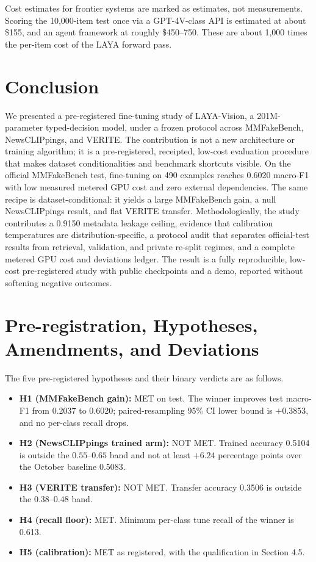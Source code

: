 \documentclass{article} %
\begin{document}
Cost estimates for frontier systems are marked as estimates, not measurements. Scoring the 10,000-item test once via a GPT-4V-class API is estimated at about \$155, and an agent framework at roughly \$450--750. These are about 1,000 times the per-item cost of the LAYA forward pass.

\section{Conclusion}
\label{sec:conclusion}
We presented a pre-registered fine-tuning study of LAYA-Vision, a 201M-parameter typed-decision model, under a frozen protocol across MMFakeBench, NewsCLIPpings, and VERITE. The contribution is not a new architecture or training algorithm; it is a pre-registered, receipted, low-cost evaluation procedure that makes dataset conditionalities and benchmark shortcuts visible. On the official MMFakeBench test, fine-tuning on 490 examples reaches 0.6020 macro-F1 with low measured metered GPU cost and zero external dependencies. The same recipe is dataset-conditional: it yields a large MMFakeBench gain, a null NewsCLIPpings result, and flat VERITE transfer. Methodologically, the study contributes a 0.9150 metadata leakage ceiling, evidence that calibration temperatures are distribution-specific, a protocol audit that separates official-test results from retrieval, validation, and private re-split regimes, and a complete metered GPU cost and deviations ledger. The result is a fully reproducible, low-cost pre-registered study with public checkpoints and a demo, reported without softening negative outcomes.




\appendix
\section{Pre-registration, Hypotheses, Amendments, and Deviations}
\label{app:protocol}
The five pre-registered hypotheses and their binary verdicts are as follows.
\begin{itemize}
    \item \textbf{H1 (MMFakeBench gain):} MET on test. The winner improves test macro-F1 from 0.2037 to 0.6020; paired-resampling 95\% CI lower bound is \(+0.3853\), and no per-class recall drops.
    \item \textbf{H2 (NewsCLIPpings trained arm):} NOT MET. Trained accuracy 0.5104 is outside the \(0.55\)--\(0.65\) band and not at least \(+6.24\) percentage points over the October baseline 0.5083.
    \item \textbf{H3 (VERITE transfer):} NOT MET. Transfer accuracy 0.3506 is outside the \(0.38\)--\(0.48\) band.
    \item \textbf{H4 (recall floor):} MET. Minimum per-class tune recall of the winner is 0.613.
    \item \textbf{H5 (calibration):} MET as registered, with the qualification in Section 4.5.
\end{itemize}
\end{document}

